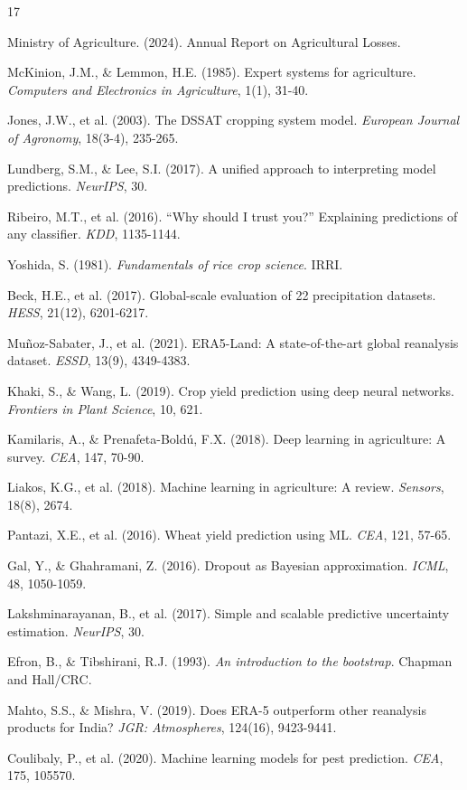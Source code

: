 \documentclass[conference,11pt]{IEEEtran}
\begin{document}
\begin{thebibliography}{17}

Ministry of Agriculture. (2024). Annual Report on Agricultural Losses.

McKinion, J.M., \& Lemmon, H.E. (1985). Expert systems for agriculture. \textit{Computers and Electronics in Agriculture}, 1(1), 31-40.

Jones, J.W., et al. (2003). The DSSAT cropping system model. \textit{European Journal of Agronomy}, 18(3-4), 235-265.

Lundberg, S.M., \& Lee, S.I. (2017). A unified approach to interpreting model predictions. \textit{NeurIPS}, 30.

Ribeiro, M.T., et al. (2016). ``Why should I trust you?'' Explaining predictions of any classifier. \textit{KDD}, 1135-1144.

Yoshida, S. (1981). \textit{Fundamentals of rice crop science}. IRRI.

Beck, H.E., et al. (2017). Global-scale evaluation of 22 precipitation datasets. \textit{HESS}, 21(12), 6201-6217.

Muñoz-Sabater, J., et al. (2021). ERA5-Land: A state-of-the-art global reanalysis dataset. \textit{ESSD}, 13(9), 4349-4383.

Khaki, S., \& Wang, L. (2019). Crop yield prediction using deep neural networks. \textit{Frontiers in Plant Science}, 10, 621.

Kamilaris, A., \& Prenafeta-Boldú, F.X. (2018). Deep learning in agriculture: A survey. \textit{CEA}, 147, 70-90.

Liakos, K.G., et al. (2018). Machine learning in agriculture: A review. \textit{Sensors}, 18(8), 2674.

Pantazi, X.E., et al. (2016). Wheat yield prediction using ML. \textit{CEA}, 121, 57-65.

Gal, Y., \& Ghahramani, Z. (2016). Dropout as Bayesian approximation. \textit{ICML}, 48, 1050-1059.

Lakshminarayanan, B., et al. (2017). Simple and scalable predictive uncertainty estimation. \textit{NeurIPS}, 30.

Efron, B., \& Tibshirani, R.J. (1993). \textit{An introduction to the bootstrap}. Chapman and Hall/CRC.

Mahto, S.S., \& Mishra, V. (2019). Does ERA-5 outperform other reanalysis products for India? \textit{JGR: Atmospheres}, 124(16), 9423-9441.

Coulibaly, P., et al. (2020). Machine learning models for pest prediction. \textit{CEA}, 175, 105570.

\end{thebibliography}
\end{document}

